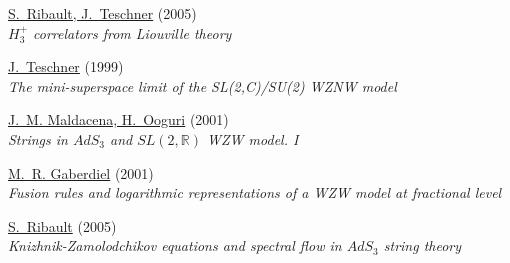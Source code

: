 \begin{thebibliography}{10}
\href{http://arxiv.org/abs/hep-th/0502048}{S.~Ribault, J.~Teschner} (2005)\\
  {\em $H_3^+$ correlators from Liouville theory\/}

\href{http://arxiv.org/abs/hep-th/9712258}{J.~Teschner} (1999)\\ {\em The
  mini-superspace limit of the {SL(2,C)/SU(2) WZNW} model\/}

\href{http://arxiv.org/abs/hep-th/0001053}{J.~M. Maldacena, H.~Ooguri} (2001)\\
  {\em Strings in {$AdS_3$ and $SL(2,\mathbb{R})$ WZW model. I}\/}

\href{http://arxiv.org/abs/hep-th/0105046}{M.~R. Gaberdiel} (2001)\\ {\em
  {Fusion rules and logarithmic representations of a WZW model at fractional
  level}\/}

\href{http://arxiv.org/abs/hep-th/0507114}{S.~Ribault} (2005)\\ {\em
  Knizhnik-Zamolodchikov equations and spectral flow in $AdS_3$ string
  theory\/}

\end{thebibliography}
